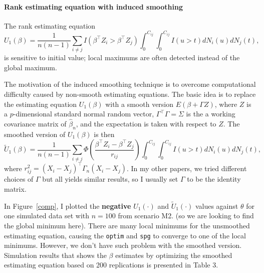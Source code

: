 \documentclass[a4paper,10pt]{article}
\begin{document}
\newpage
\paragraph{Rank estimating equation with induced smoothing}
The rank estimating equation 
\begin{equation*}
\label{E1}
U_1(\beta) = \frac{1}{n(n-1)}\sum_{i\neq j} I(\beta^\intercal Z_i >  \beta^\intercal Z_j) \int_{0}^{C_{ij}} \int_{0}^{C_{ij}} I( u>t)dN_i(u)dN_j(t),
\end{equation*}
is sensitive to initial value; local maximums are often detected instead of the global maximum.

The motivation of the induced smoothing technique is to overcome computational difficulty caused by non-smooth estimating equations. 
The basic idea is to replace the estimating equation $U_1(\beta)$ with a smooth version
$E(\beta+ \Gamma Z)$, 
where $Z$ is a $p$-dimensional standard normal random vector, $\Gamma^\top\Gamma = \Sigma$ is the 
a working covariance matrix of $\hat\beta_n$, and the expectation is taken with respect to $Z$.
The smoothed version of $U_1(\beta)$ is then
\begin{equation}
\label{smooth}
\tilde U_1(\beta) = \frac{1}{n(n-1)}\sum_{i\neq j} \Phi\left(\frac{\beta^\intercal Z_i -  \beta^\intercal Z_j}{r_{ij}}\right) \int_{0}^{C_{ij}} \int_{0}^{C_{ij}} I( u>t)dN_i(u)dN_j(t),
\end{equation}
where $r_{ij}^2 = (X_i - X_j)^\top\Gamma_n(X_i - X_j)$.
In my other papers, we tried different choices of $\Gamma$ but all yields similar results, 
so I usually set $\Gamma$ to be the identity matrix. 

In Figure~\ref{comp}, I plotted the \textbf{negative} $U_1(\cdot)$ and $\tilde U_1(\cdot)$ values against $\theta$ for one simulated data set with $n = 100$ from scenario M2. (so we are looking to find the global minimum here). 
There are many local minimums for the unsmoothed estimating equation, causing the \texttt{optim} and \texttt{spg} to converge to one of the local minimums. However, we don't have such problem with the smoothed version. Simulation results that shows the $\beta$ estimates by optimizing the smoothed estimating equation based on 200 replications is presented in Table 3. 
\end{document}
